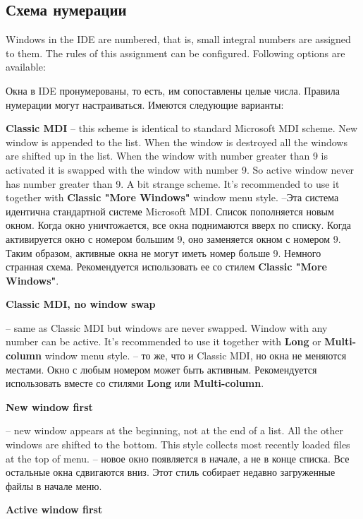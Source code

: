 \subsection {Схема нумерации}
 \fi
{}

\ifenglish
Windows in the IDE are numbered, that is, small integral numbers are assigned
to them. The rules of this assignment can be configured. Following options
are available:

 \else
Окна в IDE пронумерованы, то есть, им сопоставлены целые числа. Правила 
нумерации могут настраиваться. Имеются следующие варианты:
\fi
\begin{description}
\item {\bf Classic MDI}
\ifenglish
-- this scheme is identical to standard Microsoft MDI scheme. New window
is appended to the list. When the window is destroyed all the windows
are shifted up in the list. When the window with number greater than 9 is
activated it is swapped with the window with number 9. So active window never
has number greater than 9. A bit strange scheme. It's recommended to use it
together with {\bf Classic "More Windows"} window menu style.
 \else
--Эта система идентична стандартной системе Microsoft MDI. Список пополняется
новым окном. Когда окно уничтожается, все окна поднимаются вверх по списку.
Когда активируется окно с номером большим 9, оно заменяется окном с номером 9.
Таким образом, активные окна не могут иметь номер больше 9. Немного странная
схема. Рекомендуется использовать ее со стилем {\bf Classic "More Windows"}.
\fi

\item {\bf Classic MDI, no window swap}

\ifenglish
-- same as Classic MDI but windows are never swapped. Window with any number
can be active.  It's recommended to use it
together with {\bf Long} or {\bf Multi-column} window menu style.
 \else
-- то же, что и Classic MDI, но окна не меняются местами. Окно с любым номером
может быть активным. Рекомендуется использовать вместе со стилями {\bf Long} или {\bf Multi-column}.
\fi

\item {\bf New window first}

\ifenglish
-- new window appears at the beginning, not at the end of a list. All the other
windows are shifted to the bottom. This style collects most recently loaded
files at the top of menu.
 \else
-- новое окно появляется в начале, а не в конце списка. Все остальные окна
сдвигаются вниз. Этот стиль собирает недавно загруженные файлы в начале меню.
\fi
\item {\bf Active window first}


\end{description}
